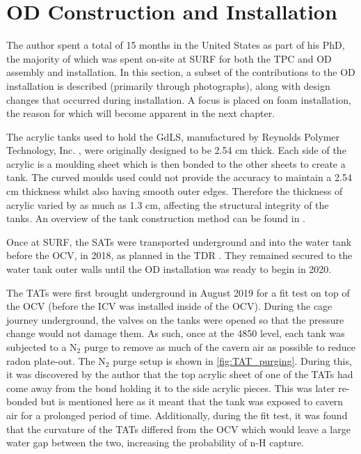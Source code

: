 \section{OD Construction and Installation} 
\label{sec:od_construction_sec}
\par
The author spent a total of 15 months in the United States as part of his PhD, the majority of which was spent on-site at SURF for both the TPC and OD assembly and installation.
In this section, a subset of the contributions to the OD installation is described (primarily through photographs), along with design changes that occurred during installation.
A focus is placed on foam installation, the reason for which will become apparent in the next chapter.

\par
The acrylic tanks used to hold the GdLS, manufactured by Reynolds Polymer Technology, Inc. \cite{reynolds_acrlyic_ref}, were originally designed to be 2.54 cm thick.
Each side of the acrylic is a moulding sheet which is then bonded to the other sheets to create a tank.
The curved moulds used could not provide the accuracy to maintain a 2.54 cm thickness whilst also having smooth outer edges.
Therefore the thickness of acrylic varied by as much as 1.3 cm, affecting the structural integrity of the tanks.
An overview of the tank construction method can be found in \cite{scotthaselschwardt_thesis_ref}.

\par
Once at SURF, the SATs were transported underground and into the water tank before the OCV, in 2018, as planned in the TDR \cite{LZ_TechnicalDesignReview_ref}.
They remained secured to the water tank outer walls until the OD installation was ready to begin in 2020. 

\par
The TATs were first brought underground in August 2019 for a fit test on top of the OCV (before the ICV was installed inside of the OCV).
During the cage journey underground, the valves on the tanks were opened so that the pressure change would not damage them.
As such, once at the 4850 level, each tank was subjected to a N$_2$ purge to remove as much of the cavern air as possible to reduce radon plate-out.
The N$_2$ purge setup is shown in \autoref{fig:TAT_purging}.
During this, it was discovered by the author that the top acrylic sheet of one of the TATs had come away from the bond holding it to the side acrylic pieces.
This was later re-bonded but is mentioned here as it meant that the tank was exposed to cavern air for a prolonged period of time.
Additionally, during the fit test, it was found that the curvature of the TATs differed from the OCV which would leave a large water gap between the two, increasing the probability of n-H capture.

